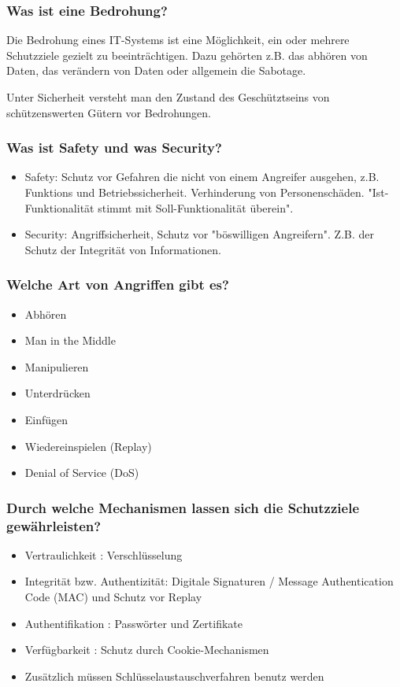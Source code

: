 	\subsubsection{Was ist eine Bedrohung?}
	Die Bedrohung eines IT-Systems ist eine Möglichkeit, ein oder mehrere Schutzziele gezielt zu beeinträchtigen. Dazu gehörten z.B. das abhören von Daten, das verändern von Daten oder allgemein die Sabotage.
	
	Unter Sicherheit versteht man den Zustand des Geschütztseins von schützenswerten Gütern vor Bedrohungen. 
	\subsubsection{Was ist Safety und was Security?}
	\begin{itemize}
		\item Safety: Schutz vor Gefahren die nicht von einem Angreifer ausgehen, z.B. Funktions und Betriebssicherheit. Verhinderung von Personenschäden. "Ist-Funktionalität stimmt mit Soll-Funktionalität überein".
		\item Security: Angriffsicherheit, Schutz vor "böswilligen Angreifern". Z.B. der Schutz der Integrität von Informationen.
	\end{itemize}
	
	\subsubsection{Welche Art von Angriffen gibt es?}
		\begin{itemize}
			\item Abhören
			\item Man in the Middle
			\item Manipulieren
			\item Unterdrücken
			\item Einfügen
			\item Wiedereinspielen (Replay)
			\item Denial of Service (DoS)
		\end{itemize}
		
	\subsubsection{Durch welche Mechanismen lassen sich die Schutzziele gewährleisten?}
	\begin{itemize}
		\item Vertraulichkeit : Verschlüsselung
		\item Integrität bzw. Authentizität: Digitale Signaturen / Message Authentication Code (MAC) und Schutz vor Replay
		\item Authentifikation : Passwörter und Zertifikate
		\item Verfügbarkeit : Schutz durch Cookie-Mechanismen
		\item Zusätzlich müssen Schlüsselaustauschverfahren benutz werden
	\end{itemize}
	
